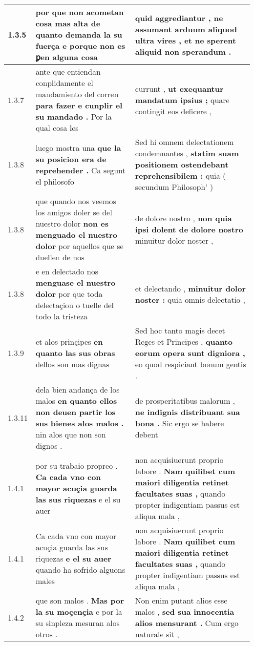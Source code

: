 \begin{tabular}{|p{1cm}|p{6.5cm}|p{6.5cm}|}
1.3.5 & por que non acometan cosa mas alta \textbf{ de quanto demanda la su fuerça } e porque non es ꝑen alguna cosa & quid aggrediantur , \textbf{ ne assumant arduum aliquod ultra vires , } et ne sperent aliquid non sperandum . \\\hline
1.3.7 & ante que entiendan conplidamente el mandamiento del corren \textbf{ para fazer e cunplir el su mandado . } Por la qual cosa les & currunt , \textbf{ ut exequantur mandatum ipsius ; } quare contingit eos deficere , \\\hline
1.3.8 & luego mostra una \textbf{ que la su posicion era de reprehender . } Ca segunt el philosofo & Sed hi omnem delectationem condemnantes , \textbf{ statim suam positionem ostendebant reprehensibilem : } quia ( secundum Philosoph’ ) \\\hline
1.3.8 & que quando nos veemos los amigos doler se del nuestro dolor \textbf{ non es menguado el nuestro dolor } por aquellos que se duellen de nos & de dolore nostro , \textbf{ non quia ipsi dolent de dolore nostro } minuitur dolor noster , \\\hline
1.3.8 & e en delectado nos \textbf{ menguase el nuestro dolor } por que toda delectaçion o tuelle del todo la tristeza & et delectando , \textbf{ minuitur dolor noster : } quia omnis delectatio , \\\hline
1.3.9 & et alos prinçipes \textbf{ en quanto las sus obras } dellos son mas dignas & Sed hoc tanto magis decet Reges et Principes , \textbf{ quanto eorum opera sunt digniora , } eo quod respiciant bonum gentis . \\\hline
1.3.11 & dela bien andança de los malos \textbf{ en quanto ellos non deuen partir los sus bienes alos malos . } nin alos que non son dignos . & de prosperitatibus malorum , \textbf{ ne indignis distribuant sua bona . } Sic ergo se habere debent \\\hline
1.4.1 & por su trabaio propreo . \textbf{ Ca cada vno con mayor acuçia guarda las sus riquezas } e el su auer & non acquisiuerunt proprio labore . \textbf{ Nam quilibet cum maiori diligentia retinet facultates suas , } quando propter indigentiam passus est aliqua mala , \\\hline
1.4.1 & Ca cada vno con mayor acuçia guarda las sus riquezas \textbf{ e el su auer } quando ha sofrido alguons males & non acquisiuerunt proprio labore . \textbf{ Nam quilibet cum maiori diligentia retinet facultates suas , } quando propter indigentiam passus est aliqua mala , \\\hline
1.4.2 & que son malos . \textbf{ Mas por la su moçençia } e por la su sinpleza mesuran alos otros . & Non enim putant alios esse malos , \textbf{ sed sua innocentia alios mensurant . } Cum ergo naturale sit , \\\hline

\end{tabular}
